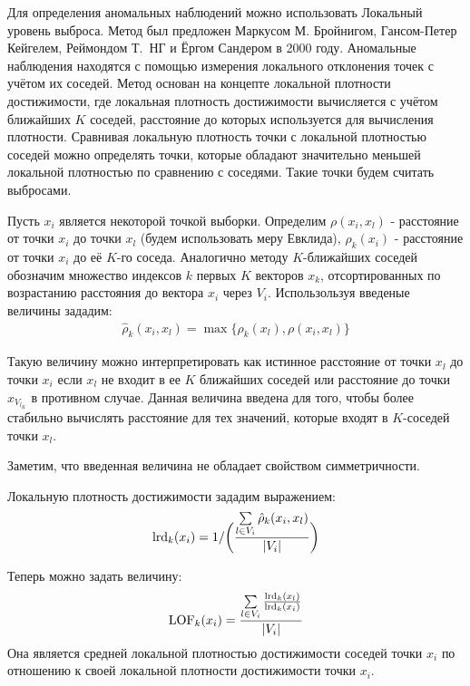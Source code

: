 Для определения аномальных наблюдений можно использовать Локальный уровень выброса. Метод был предложен Маркусом М. Бройнигом, Гансом-Петер Кейгелем, Реймондом Т.~НГ и Ёргом Сандером в 2000 году. Аномальные наблюдения находятся с помощью измерения локального отклонения точек с учётом их соседей.
Метод основан на концепте локальной плотности достижимости, где локальная плотность достижимости вычисляется с учётом ближайших $K$ соседей, расстояние до которых используется для вычисления плотности. Сравнивая локальную плотность точки с локальной плотностью соседей можно определять точки, которые обладают значительно меньшей локальной плотностью по сравнению с соседями. Такие точки будем считать выбросами.

Пусть $x_i$ является некоторой точкой выборки. Определим $\rho(x_i, x_l)$ - расстояние от точки $x_i$ до точки $x_l$ (будем использовать меру Евклида), $\rho_k(x_i)$ - расстояние от точки $x_i$ до её $K$-го соседа. 
Аналогично методу $K$-ближайших соседей обозначим множество индексов $k$ первых $K$ векторов $x_k$, отсортированных по возрастанию расстояния до вектора $x_i$ через $V_i$.
Использользуя введеные величины зададим:
\begin{eqnarray}
    \hat{\rho}_k(x_i, x_l) = \max\{\rho_k(x_l), \rho(x_i, x_l)\}
\end{eqnarray}

Такую величину можно интерпретировать как истинное расстояние от точки $x_l$ до точки $x_i$ если $x_l$ не входит в ее $K$ ближайших соседей или расстояние до точки $x_{V_{l_K}}$ в противном случае. 
Данная величина введена для того, чтобы более стабильно вычислять расстояние для тех значений, которые входят в $K$-соседей точки $x_l$. 

Заметим, что введенная величина не обладает свойством симметричности.

Локальную плотность достижимости зададим выражением:
\begin{eqnarray}
    \textup{lrd}_k(x_i) = 1 / \bigg(\frac{\sum\limits_{l\in V_i}\hat{\rho}_k(x_i, x_l)}{|V_i|}\bigg)
\end{eqnarray}

Теперь можно задать величину:
\begin{eqnarray}
    \textup{LOF}_k(x_i) = \frac{\sum\limits_{l\in V_i}\frac{\textup{lrd}_k(x_l)}{\textup{lrd}_k(x_i)}}{|V_i|}
\end{eqnarray}
Она является средней локальной плотностью достижимости соседей точки $x_i$ по отношению к своей локальной плотности достижимости точки $x_i$. 

